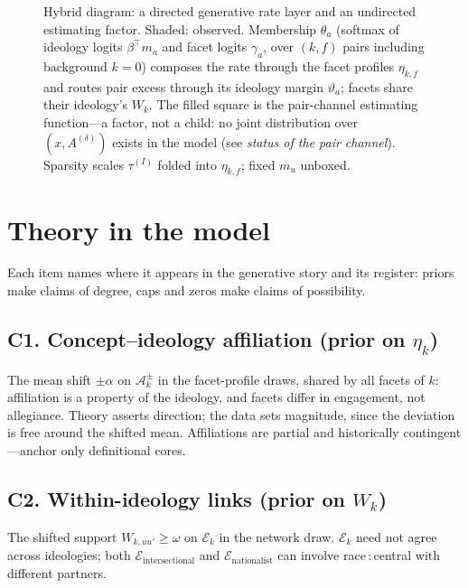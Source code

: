 \documentclass[11pt]{article}
\newcommand{\Acal}{\mathcal{A}}
\newcommand{\Ecal}{\mathcal{E}}
\newcommand{\1}{\mathbb{1}}
\newcommand{\node}[2]{\textsf{#1\,:\,#2}}
\begin{document}
\begin{figure}[h]
\caption{\small Hybrid diagram: a directed generative rate layer and an undirected estimating factor. Shaded: observed. Membership $\theta_a$ (softmax of ideology logits $\beta^\top m_a$ and facet logits $\gamma_a$, over $(k,f)$ pairs including background $k{=}0$) composes the rate through the facet profiles $\eta_{k,f}$ and routes pair excess through its ideology margin $\vartheta_a$; facets share their ideology's $W_k$. The filled square is the pair-channel estimating function---a factor, not a child: no joint distribution over $(x,A^{(\delta)})$ exists in the model (see \emph{status of the pair channel}). Sparsity scales $\tau^{(I)}$ folded into $\eta_{k,f}$; fixed $m_u$ unboxed.}
\end{figure}

\section{Theory in the model}\label{sec:constraints}

Each item names where it appears in the generative story and its register: priors make claims of degree, caps and zeros make claims of possibility.

\subsection*{C1. Concept--ideology affiliation (prior on $\eta_k$)}
The mean shift $\pm\alpha$ on $\Acal^\pm_k$ in the facet-profile draws, shared by all facets of $k$: affiliation is a property of the ideology, and facets differ in engagement, not allegiance. Theory asserts direction; the data sets magnitude, since the deviation is free around the shifted mean. Affiliations are partial and historically contingent---anchor only definitional cores.

\subsection*{C2. Within-ideology links (prior on $W_k$)}
The shifted support $W_{k,uu'}\ge\omega$ on $\Ecal_k$ in the network draw. $\Ecal_k$ need not agree across ideologies; both $\Ecal_{\text{intersectional}}$ and $\Ecal_{\text{nationalist}}$ can involve \node{race}{central} with different partners.
\end{document}
